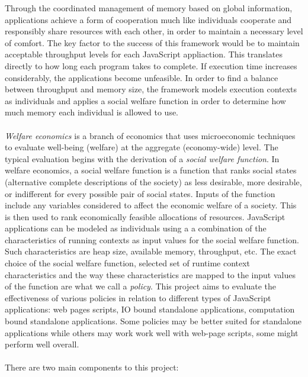 \documentclass{l4proj}
\begin{document}
\hspace*{3em} Through the coordinated management of memory based on global information, applications achieve a form of cooperation much like individuals cooperate and responsibly share resources with each other, in order to maintain a necessary level of comfort. The key factor to the success of this framework would be to maintain acceptable throughput levels for each JavaScript appliaction. This translates directly to how long each program takes to complete. If execution time increases considerably, the applications become unfeasible. In order to find a balance between throughput and memory size, the framework models execution contexts as individuals and applies a social welfare function in order to determine how much memory each individual is allowed to use.
\\\\%
\hspace*{3em} \textit{Welfare economics} is a branch of economics that uses microeconomic techniques to evaluate well-being (welfare) at the aggregate (economy-wide) level.\cite{welfareeconomics} The typical evaluation begins with the derivation of a \textit{social welfare function}. In welfare economics, a social welfare function is a function that ranks social states (alternative complete descriptions of the society) as less desirable, more desirable, or indifferent for every possible pair of social states. Inputs of the function include any variables considered to affect the economic welfare of a society.\cite{socialwelfarefunction} This is then used to rank economically feasible allocations of resources. JavaScript applications can be modeled as individuals using a a combination of the characteristics of running contexts as input values for the social welfare function. Such characteristics are heap size, available memory, throughput, etc. The exact choice of the social welfare function, selected set of runtime context characteristics and the way these characteristics are mapped to the input values of the function are what we call a \textit{policy}. This project aims to evaluate the effectiveness of various policies in relation to different types of JavaScript applications: web pages scripts, IO bound standalone applications, computation bound standalone applications. Some policies may be better suited for standalone applications while others may work work well with web-page scripts, some might perform well overall. 
\\\\
There are two main components to this project:
\end{document}

